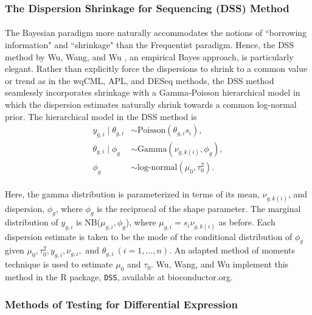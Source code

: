 \documentclass[10pt]{article}
\begin{document}
\subsubsection*{The Dispersion Shrinkage for Sequencing (DSS) Method}

\paragraph{} \indent The Bayesian paradigm more naturally accommodates the notions of ``borrowing information" and ``shrinkage" than the Frequentist paradigm. Hence, the DSS method by Wu, Wang, and Wu \cite{dss}, an empirical Bayes approach, is particularly elegant. Rather than explicitly force the dispersions to shrink to a common value or trend as in the wqCML, APL, and DESeq methods, the DSS method seamlessly incorporates shrinkage with a Gamma-Poisson hierarchical model in which the dispersion estimates naturally shrink towards a common log-normal prior. The hierarchical model in the DSS method is
\begin{align*}
y_{g, i} \mid \theta_{g, i} &\sim \text{Poisson}(\theta_{g, i} s_i), \\
\theta_{g, i} \mid \phi_g &\sim \text{Gamma}(\nu_{g, k(i)}, \phi_g), \\
\phi_g &\sim \text{log-normal}(\mu_0, \tau_0^2).
\end{align*}
\paragraph{} \indent Here, the gamma distribution is parameterized in terms of its mean, $\nu_{g, k(i)}$, and dispersion, $\phi_g$, where $\phi_g$ is the reciprocal of the shape parameter. The marginal distribution of $y_{g, i}$ is NB($\mu_{g, i}, \phi_g$), where $\mu_{g, i} = s_i \nu_{g, k(i)}$ as before. Each dispersion estimate is taken to be the mode of the conditional distribution of $\phi_g$ given $\mu_0, \tau_0^2, y_{g, i}, \nu_{g, i}, \text{ and } \theta_{g, i} \ (i = 1, \ldots, n)$. An adapted method of moments technique is used to estimate $\mu_0$ and $\tau_0$. Wu, Wang, and Wu \cite{dss} implement this method in the R package, {\tt DSS}, available at bioconductor.org.







\subsubsection*{Methods of Testing for Differential Expression} \label{sec:test}
\end{document}
